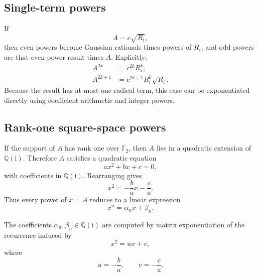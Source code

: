 \documentclass[11pt]{article}
\newcommand{\QQ}{\mathbb{Q}}
\newcommand{\FF}{\mathbb{F}}
\newcommand{\ii}{\mathrm{i}}
\begin{document}
\subsection{Single-term powers}

If
\begin{equation}
  A=c\sqrt{R_i},
\end{equation}
then even powers become Gaussian rationals times powers of \(R_i\), and odd powers are that even-power result times \(A\). Explicitly:
\begin{align*}
  A^{2k} &= c^{2k} R_i^k,\\
  A^{2k+1} &= c^{2k+1} R_i^k\sqrt{R_i}.
\end{align*}
Because the result has at most one radical term, this case can be exponentiated directly using coefficient arithmetic and integer powers.

\subsection{Rank-one square-space powers}

If the support of \(A\) has rank one over \(\FF_2\), then \(A\) lies in a quadratic extension of \(\QQ(\ii)\). Therefore \(A\) satisfies a quadratic equation
\begin{equation}
  a x^2 + b x + c = 0,
\end{equation}
with coefficients in \(\QQ(\ii)\). Rearranging gives
\begin{equation}
  x^2 = -\frac{b}{a}x - \frac{c}{a}.
\end{equation}
Thus every power of \(x=A\) reduces to a linear expression
\begin{equation}
  x^n = \alpha_n x + \beta_n.
\end{equation}

The coefficients \(\alpha_n,\beta_n\in\QQ(\ii)\) are computed by matrix exponentiation of the recurrence induced by
\begin{equation}
  x^2 = ux+v,
\end{equation}
where
\begin{equation}
  u=-\frac{b}{a}, \qquad v=-\frac{c}{a}.
\end{equation}
\end{document}
